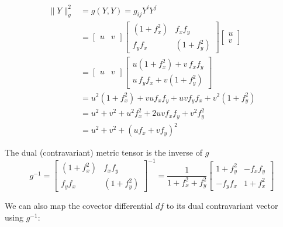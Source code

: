 \documentclass[11pt]{article}
\begin{document}
\begin{align}
    \| Y \|_{g}^2
    &= g(Y,Y) = g_{ij} Y^i Y^j\\
    &= 
    \begin{bmatrix}
    u & v
    \end{bmatrix}
    \begin{bmatrix}
        (1+f_x^2) & f_x f_y  \\
        f_y f_x  & (1+f_y^2)
    \end{bmatrix}
    \begin{bmatrix}
    u \\ v
    \end{bmatrix} 
    \\
    &=
    \begin{bmatrix}
    u & v
    \end{bmatrix}
    \begin{bmatrix}
    u(1+f_x^2) + v \,f_x f_y  \\ 
    u \,f_y f_x   + v (1+f_y^2)
    \end{bmatrix} \\
    &= u^2(1+f_x^2) + v uf_x f_y  + u v f_y f_x   + v^2(1+f_y^2)  \\
    &= u^2 + v^2 + u^2 f_x^2  + 2 u v f_x  f_y  + v^2 f_y^2 \\
    &= u^2 + v^2 + (u f_x  +  vf_y)^2
\end{align}

    The dual (contravariant) metric tensor is the inverse of \(g\)
\begin{equation}
    g^{-1}
    =
    \begin{bmatrix}
        (1+f_x^2) & f_x f_y  \\
        f_y f_x  & (1+f_y^2)
    \end{bmatrix}^{-1}
    =
    \dfrac{1}{1+f_x^2+f_y^2}
    \begin{bmatrix}
        {1+f_y^2}  & -{f_x f_y}  \\
        -{f_y f_x} & {1+f_x^2}
    \end{bmatrix}
\end{equation}

    We can also map the covector differential \(df\) to its dual
contravariant vector using \(g^{-1}\):
\end{document}
